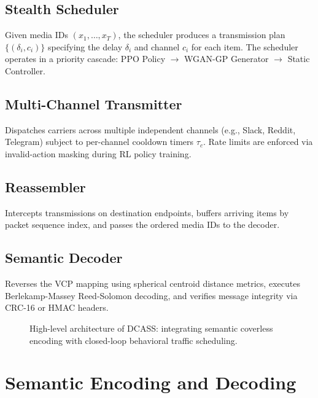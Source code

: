 \documentclass[conference]{IEEEtran}
\begin{document}
\subsection{Stealth Scheduler}
Given media IDs $(x_1, \dots, x_T)$, the scheduler produces a transmission plan $\{(\delta_i, c_i)\}$ specifying the delay $\delta_i$ and channel $c_i$ for each item. The scheduler operates in a priority cascade: PPO Policy $\to$ WGAN-GP Generator $\to$ Static Controller.

\subsection{Multi-Channel Transmitter}
Dispatches carriers across multiple independent channels (e.g., Slack, Reddit, Telegram) subject to per-channel cooldown timers $\tau_c$. Rate limits are enforced via invalid-action masking during RL policy training.

\subsection{Reassembler}
Intercepts transmissions on destination endpoints, buffers arriving items by packet sequence index, and passes the ordered media IDs to the decoder.

\subsection{Semantic Decoder}
Reverses the VCP mapping using spherical centroid distance metrics, executes Berlekamp-Massey Reed-Solomon decoding, and verifies message integrity via CRC-16 or HMAC headers.

\begin{figure}[t]
\centering
{}
\caption{High-level architecture of DCASS: integrating semantic coverless encoding with closed-loop behavioral traffic scheduling.}
\label{fig:arch_compact}
\end{figure}

\section{Semantic Encoding and Decoding}
\end{document}
